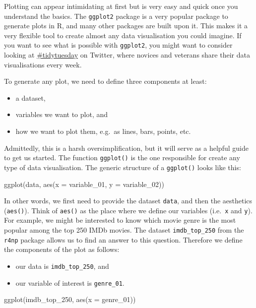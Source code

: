 \documentclass[
]{book}
\newenvironment{Shaded}{\begin{snugshade}}{\end{snugshade}}
\newcommand{\AttributeTok}[1]{\textcolor[rgb]{0.77,0.63,0.00}{#1}}
\newcommand{\FunctionTok}[1]{\textcolor[rgb]{0.00,0.00,0.00}{#1}}
\newcommand{\NormalTok}[1]{#1}
\begin{document}
Plotting can appear intimidating at first but is very easy and quick once you understand the basics. The \texttt{ggplot2} package is a very popular package to generate plots in R, and many other packages are built upon it. This makes it a very flexible tool to create almost any data visualisation you could imagine. If you want to see what is possible with \texttt{ggplot2}, you might want to consider looking at \href{https://twitter.com/search?q=\%23tidytuesday}{\#tidytuesday} on Twitter, where novices and veterans share their data visualisations every week.

To generate any plot, we need to define three components at least:

\begin{itemize}
\item
  a dataset,
\item
  variables we want to plot, and
\item
  how we want to plot them, e.g.~as lines, bars, points, etc.
\end{itemize}

Admittedly, this is a harsh oversimplification, but it will serve as a helpful guide to get us started. The function \texttt{ggplot()} is the one responsible for create any type of data visualisation. The generic structure of a \texttt{ggplot()} looks like this:

\leavevmode\hypertarget{basic_ggplot_structure}{}%
ggplot(data, aes(x = variable\_01, y = variable\_02))

In other words, we first need to provide the dataset \texttt{data}, and then the aesthetics (\texttt{aes()}). Think of \texttt{aes()} as the place where we define our variables (i.e.~\texttt{x} and \texttt{y}). For example, we might be interested to know which movie genre is the most popular among the top 250 IMDb movies. The dataset \texttt{imdb\_top\_250} from the \texttt{r4np} package allows us to find an answer to this question. Therefore we define the components of the plot as follows:

\begin{itemize}
\item
  our data is \texttt{imdb\_top\_250}, and
\item
  our variable of interest is \texttt{genre\_01}.
\end{itemize}

\begin{Shaded}
\begin{Highlighting}[]
\FunctionTok{ggplot}\NormalTok{(imdb\_top\_250, }\FunctionTok{aes}\NormalTok{(}\AttributeTok{x =}\NormalTok{ genre\_01))}
\end{Highlighting}
\end{Shaded}
\end{document}
